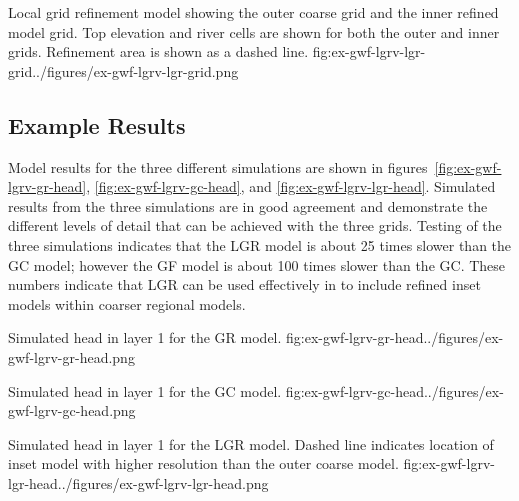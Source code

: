 \begin{StandardFigure}{
                                     Local grid refinement model showing the outer coarse grid and the inner refined model grid.  Top elevation and river cells are shown for both the outer and inner grids.  Refinement area is shown as a dashed line.
                                     }{fig:ex-gwf-lgrv-lgr-grid}{../figures/ex-gwf-lgrv-lgr-grid.png}
\end{StandardFigure}                                 

\subsection{Example Results}

Model results for the three different simulations are shown in figures~\ref{fig:ex-gwf-lgrv-gr-head}, \ref{fig:ex-gwf-lgrv-gc-head}, and \ref{fig:ex-gwf-lgrv-lgr-head}.  Simulated results from the three simulations are in good agreement and demonstrate the different levels of detail that can be achieved with the three grids.  Testing of the three simulations indicates that the LGR model is about 25 times slower than the GC model; however the GF model is about 100 times slower than the GC.  These numbers indicate that LGR can be used effectively in \mf to include refined inset models within coarser regional models.

\begin{StandardFigure}{
                                     Simulated head in layer 1 for the GR model.
                                     }{fig:ex-gwf-lgrv-gr-head}{../figures/ex-gwf-lgrv-gr-head.png}
\end{StandardFigure}                                 

\begin{StandardFigure}{
                                     Simulated head in layer 1 for the GC model.
                                     }{fig:ex-gwf-lgrv-gc-head}{../figures/ex-gwf-lgrv-gc-head.png}
\end{StandardFigure}                                 

\begin{StandardFigure}{
                                     Simulated head in layer 1 for the LGR model.  Dashed line indicates location of inset model with higher resolution than the outer coarse model.  
                                     }{fig:ex-gwf-lgrv-lgr-head}{../figures/ex-gwf-lgrv-lgr-head.png}
\end{StandardFigure}                                 
